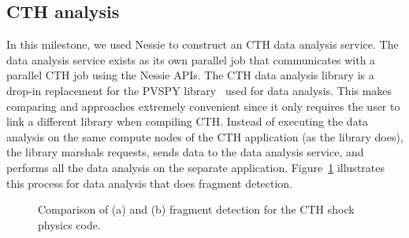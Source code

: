 \subsection{CTH \intransit analysis}

In this milestone, we used Nessie to construct an \intransit CTH data
analysis service.  The data analysis service exists as its own parallel job
that communicates with a parallel CTH job using the Nessie APIs.  The
\intransit CTH data analysis library is a drop-in replacement for the PVSPY
library~\cite{moreland:2010:coprocessing-milestone} used for \insitu data
analysis.  This makes comparing \insitu and \intransit approaches extremely
convenient since it only requires the user to link a different library when
compiling CTH.  Instead of executing the data analysis on the same compute
nodes of the CTH application (as the \insitu library does), the \intransit
library marshals requests, sends data to the data analysis service, and
performs all the data analysis on the separate application.
Figure~\ref{fig:cth-service} illustrates this process for data analysis
that does fragment detection.

\begin{figure}
\begin{centering}
\caption[\Insitu and \intransit data analysis]{Comparison of \insitu (a)
  and \intransit (b) fragment detection for the CTH shock physics code.}
\label{fig:cth-service}
\end{centering}
\end{figure}

